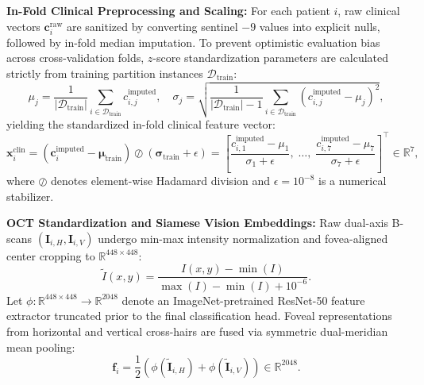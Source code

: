 \documentclass[preprint,12pt]{elsarticle}
\begin{document}
\noindent\textbf{In-Fold Clinical Preprocessing and Scaling:} For each patient $i$, raw clinical vectors $\mathbf{c}_i^{\text{raw}}$ are sanitized by converting sentinel $-9$ values into explicit nulls, followed by in-fold median imputation. To prevent optimistic evaluation bias across cross-validation folds, $z$-score standardization parameters are calculated strictly from training partition instances $\mathcal{D}_{\text{train}}$:
\begin{equation}
\mu_j = \frac{1}{|\mathcal{D}_{\text{train}}|} \sum_{i \in \mathcal{D}_{\text{train}}} c_{i,j}^{\text{imputed}}, \quad \sigma_j = \sqrt{\frac{1}{|\mathcal{D}_{\text{train}}| - 1} \sum_{i \in \mathcal{D}_{\text{train}}} \left( c_{i,j}^{\text{imputed}} - \mu_j \right)^2},
\end{equation}
yielding the standardized in-fold clinical feature vector:
\begin{equation}
\mathbf{x}_i^{\text{clin}} = \left( \mathbf{c}_i^{\text{imputed}} - \bm{\mu}_{\text{train}} \right) \oslash \left( \bm{\sigma}_{\text{train}} + \epsilon \right) = \left[ \frac{c_{i,1}^{\text{imputed}} - \mu_1}{\sigma_1 + \epsilon}, \; \dots, \; \frac{c_{i,7}^{\text{imputed}} - \mu_7}{\sigma_7 + \epsilon} \right]^{\top} \in \mathbb{R}^7,
\end{equation}
where $\oslash$ denotes element-wise Hadamard division and $\epsilon = 10^{-8}$ is a numerical stabilizer.

\noindent\textbf{OCT Standardization and Siamese Vision Embeddings:} Raw dual-axis B-scans $(\mathbf{I}_{i,H}, \mathbf{I}_{i,V})$ undergo min-max intensity normalization and fovea-aligned center cropping to $\mathbb{R}^{448 \times 448}$:
\begin{equation}
\tilde{I}(x, y) = \frac{I(x, y) - \min(I)}{\max(I) - \min(I) + 10^{-6}}.
\end{equation}
Let $\phi: \mathbb{R}^{448 \times 448} \to \mathbb{R}^{2048}$ denote an ImageNet-pretrained ResNet-50 feature extractor truncated prior to the final classification head. Foveal representations from horizontal and vertical cross-hairs are fused via symmetric dual-meridian mean pooling:
\begin{equation}
\mathbf{f}_i = \frac{1}{2}\left( \phi(\tilde{\mathbf{I}}_{i,H}) + \phi(\tilde{\mathbf{I}}_{i,V}) \right) \in \mathbb{R}^{2048}.
\end{equation}
\end{document}
